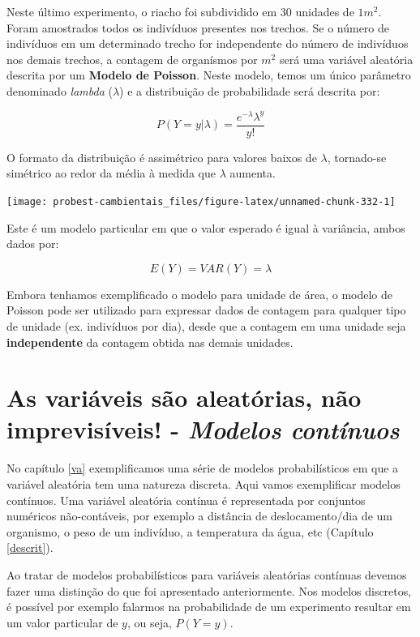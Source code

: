 \documentclass[
]{book}
\begin{document}
Neste último experimento, o riacho foi subdividido em 30 unidades de \(1m^2\). Foram amostrados todos os indivíduos presentes nos trechos. Se o número de indivíduos em um determinado trecho for independente do número de indivíduos nos demais trechos, a contagem de organísmos por \(m^2\) será uma variável aleatória descrita por um \textbf{Modelo de Poisson}. Neste modelo, temos um único parâmetro denominado \emph{lambda} (\(\lambda\)) e a distribuição de probabilidade será descrita por:

\[P(Y = y|\lambda) =  \frac{e^{-\lambda} \lambda^y}{y!}\]

O formato da distribuição é assimétrico para valores baixos de \(\lambda\), tornado-se simétrico ao redor da média à medida que \(\lambda\) aumenta.

\begin{center}\texttt{[image: probest-cambientais\_files/figure-latex/unnamed-chunk-332-1]} \end{center}

Este é um modelo particular em que o valor esperado é igual à variância, ambos dados por:

\[E(Y) = VAR(Y) = \lambda\]

Embora tenhamos exemplificado o modelo para unidade de área, o modelo de Poisson pode ser utilizado para expressar dados de contagem para qualquer tipo de unidade (ex. indivíduos por dia), desde que a contagem em uma unidade seja \textbf{independente} da contagem obtida nas demais unidades.

\hypertarget{vacont}{%
\chapter{\texorpdfstring{As variáveis são aleatórias, não imprevisíveis! - \emph{Modelos contínuos}}{As variáveis são aleatórias, não imprevisíveis! - Modelos contínuos}}\label{vacont}}

No capítulo \ref{va} exemplificamos uma série de modelos probabilísticos em que a variável aleatória tem uma natureza discreta. Aqui vamos exemplificar modelos contínuos. Uma variável aleatória contínua é representada por conjuntos numéricos não-contáveis, por exemplo a distância de deslocamento/dia de um organismo, o peso de um indivíduo, a temperatura da água, etc (Capítulo \ref{descrit}).

Ao tratar de modelos probabilísticos para variáveis aleatórias contínuas devemos fazer uma distinção do que foi apresentado anteriormente. Nos modelos discretos, é possível por exemplo falarmos na probabilidade de um experimento resultar em um valor particular de \(y\), ou seja, \(P(Y = y)\).
\end{document}
